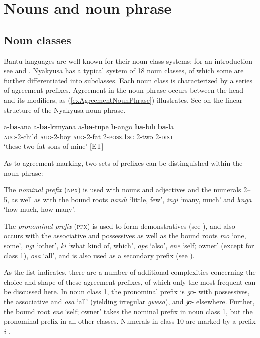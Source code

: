 \section{Nouns and noun phrase}
\subsection{Noun classes}\label{NounClasses}
Bantu languages are well-known for their noun class systems; for an introduction see \citet[ch. 3]{MahoJ1999} and \citet{KatambaF2003}. Nyakyusa has a typical system of 18 noun classes, of which some are further differentiated into subclasses. Each noun class is characterized by a series of agreement prefixes. Agreement in the noun phrase occurs between the head and its modifiers, as (\ref{exAgreementNounPhrase}) illustrates. See \citet{LusekeloA2009a} on the linear structure of the Nyakyusa noun phrase.

\begin{exe}
	\ex\label{exAgreementNounPhrase}
	\gll a-\textbf{ba}-ana a-\textbf{ba}-lʊmyana a-\textbf{ba}-tupe \textbf{b}-angʊ \textbf{ba}-bɪlɪ \textbf{ba}-la\\
	\textsc{aug}-2-child \textsc{aug}-2-boy \textsc{aug}-2-fat 2-\textsc{poss.1sg} 2-two  2-\textsc{dist}\\
	\glt `these two fat sons of mine' [ET]
\end{exe}

As to agreement marking, two sets of prefixes can be distinguished within the noun phrase:

\begin{compactitem}
	\item The \textit{nominal prefix} (\textsc{npx}) is used with nouns and adjectives and the numerals 2--5, as well as with the bound roots \textit{nandɪ} `little, few', \textit{ingi} `many, much' and \textit{lɪnga} `how much, how many'.
	\item The \textit{pronominal prefix} (\textsc{ppx}) is used to form demonstratives (see ), and also occurs with the associative and possessives as well as the bound roots \textit{mo} `one, some', \textit{ngɪ} `other', \textit{ki} `what kind of, which', \textit{ope} `also', \textit{ene} `self; owner' (except for class 1), \textit{osa} `all', and is also used as a secondary prefix (see ).
\end{compactitem}

As the list indicates, there are a number of additional complexities concerning the choice and shape of these agreement prefixes, of which only the most frequent can be discussed here. In noun class 1, the pronominal prefix is \textit{gʊ}- with possessives, the associative and \textit{osa} `all' (yielding irregular \textit{gwesa}), and \textit{jʊ}- elsewhere. Further, the bound root \textit{ene} `self; owner' takes the nominal prefix in noun class 1, but the pronominal prefix in all other classes. Numerals in class 10 are marked by a prefix \textit{i}-.

